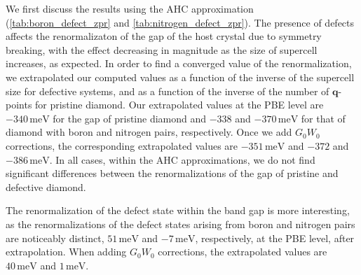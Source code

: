 \documentclass[journal=jctcce,manuscript=article]{achemso}
\newcommand{\bfq}{{\mathbf{q}}}
\begin{document}
We first discuss the results using the AHC approximation (\autoref{tab:boron_defect_zpr} and \autoref{tab:nitrogen_defect_zpr}). The presence  of defects affects  the renormalizaton of the gap of the host crystal due to symmetry breaking,\cite{kundu2021quantum} with the effect decreasing in magnitude  as the size of supercell increases, as expected. In order to find a converged value of the renormalization, we extrapolated our computed values as a function of the inverse of the supercell size for defective systems, and as a function of the inverse of the number of $\bfq$-points for pristine diamond. Our extrapolated values at the PBE level are $-340\,\mathrm{meV}$ for the gap of pristine diamond and  $-338$ and $-370\,\mathrm{meV}$ for that of diamond with boron and nitrogen pairs, respectively. Once we add  $G_0W_0$ corrections, the corresponding extrapolated values are  $-351\,\mathrm{meV}$ and  $-372$ and $-386\,\mathrm{meV}$. In all cases, within the AHC approximations, we do not find significant differences between the renormalizations of the gap of pristine and defective diamond.  

The renormalization of the defect state within the band gap is more interesting, as the renormalizations of the defect states arising from boron and nitrogen pairs are noticeably distinct,  $51\,\mathrm{meV}$ and  $-7\,\mathrm{meV}$, respectively, at the PBE level, after extrapolation. When adding $G_0W_0$ corrections, the extrapolated values are $40\,\mathrm{meV}$ and $1\,\mathrm{meV}$. 

\end{document}

